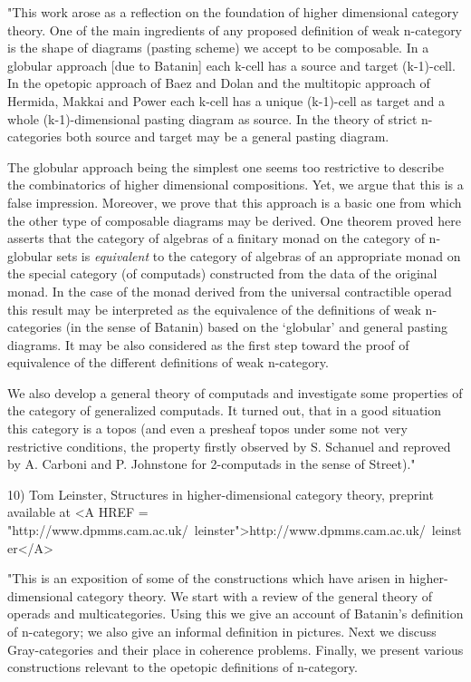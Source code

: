 "This work arose as a reflection on the foundation of higher
dimensional category theory.  One of the main ingredients of any
proposed definition of weak n-category is the shape of diagrams
(pasting scheme) we accept to be composable. In a globular approach
[due to Batanin] each k-cell has a source and target (k-1)-cell.  In
the opetopic approach of Baez and Dolan and the multitopic approach of
Hermida, Makkai and Power each k-cell has a unique (k-1)-cell as
target and a whole (k-1)-dimensional pasting diagram as source.  In
the theory of strict n-categories both source and target may be a
general pasting diagram.

The globular approach being the simplest one seems too restrictive to
describe the combinatorics of higher dimensional compositions.  Yet, we
argue that this is a false impression. Moreover, we prove that this
approach is a basic one from which the other type of composable
diagrams may be derived.  One theorem proved here asserts that the
category of algebras of a finitary monad on the category of n-globular
sets is \emph{equivalent} to the category of algebras of an appropriate
monad on the special category (of computads) constructed from the data
of the original monad. In the case of the monad derived from the
universal contractible operad this result may be interpreted as the
equivalence of the definitions of weak n-categories (in the sense of
Batanin) based on the `globular' and general pasting diagrams.  It may
be also considered as the first step toward the proof of equivalence
of the different definitions of weak n-category.

We also develop a general theory of computads and investigate some
properties of the category of generalized computads.  It turned out,
that in a good situation this category is a topos (and even a presheaf
topos under some not very restrictive conditions, the property firstly
observed by S. Schanuel and reproved by A. Carboni and P. Johnstone
for 2-computads in the sense of Street)."

10) Tom Leinster, Structures in higher-dimensional category theory,
preprint available at <A HREF = "http://www.dpmms.cam.ac.uk/~leinster">http://www.dpmms.cam.ac.uk/~leinster</A>

"This is an exposition of some of the constructions which have arisen
in higher-dimensional category theory.  We start with a review of the
general theory of operads and multicategories.  Using this we give an
account of Batanin's definition of n-category; we also give an
informal definition in pictures.  Next we discuss Gray-categories and
their place in coherence problems.  Finally, we present various
constructions relevant to the opetopic definitions of n-category.

